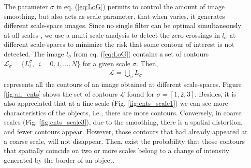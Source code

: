 The parameter $\sigma$ in eq. (\ref{eq:LoG}) permits to control the amount of image smoothing, but also acts as scale parameter, that when varies, it generates different scale-space images. Since no single filter can be optimal simultaneously at all scales \citep{Marr.Hildreth:PRS:1980}, we use a multi-scale analysis \citep{Witkin:ICASSP:1984} to detect the zero-crossings in $l_\sigma$ at different scale-spaces to minimize the risk that some contour of interest is not detected. The image $l_\sigma$ from eq. (\ref{eq:LoG}) contains a set of contours $\mathcal{L}_{\sigma}=\{L_{i}^{\sigma}, \enspace i=0, 1, \ldots, N\}$ for a given scale $\sigma$. Then, 
\begin{eqnarray}\label{eq:all_ctns_set}
\mathcal{L}=\bigcup\limits_{\sigma}  L_{\sigma}
\end{eqnarray}
represents all the contours of an image obtained at different scale-spaces. Figure \ref{fig:all_cnts} shows the set of contours $\mathcal{L}$ found for $\sigma=[1,2,3]$. Besides, it is also appreciated that at a fine scale (Fig. \ref{fig:cnts_scale1}) we can see more characteristics of the objects, i.e., there are more contours. Conversely, in coarse scales (Fig. \ref{fig:cnts_scale3}), due to the smoothing, there is a spatial distortion, and fewer contours appear. However, those contours that had already appeared at a coarse scale, will not disappear. Then, exist the probability that those contours that spatially coincide on two or more scales belong to a change of intensity generated by the border of an object. 

